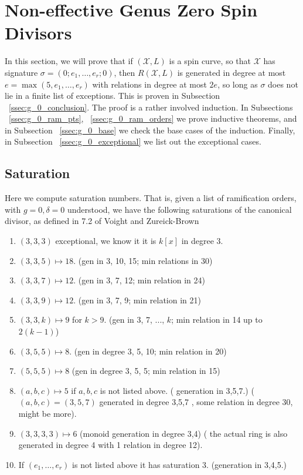 \documentclass{amsart}
\theoremstyle{plain}
\theoremstyle{definition}
\theoremstyle{remark}
\numberwithin{equation}{section}
\newcommand\ssec{\subsection}
\newcommand \sx{\mathscr X}
\newcommand \halfcan{L}
\begin{document}
\section{Non-effective Genus Zero Spin Divisors}
\label{sec:g_0_non_effective}

In this section, we will prove that if $(\sx,\halfcan)$ is a spin
curve, so that $\sx$ has signature $\sigma = (0; e_1, \ldots, e_r;0)
$, then $R(\sx,\halfcan)$ is generated in degree at most $e =
\max(5, e_1, \ldots, e_r)$ with relations in degree at most $2e$, so
long as $\sigma$ does not lie in a finite list of exceptions. This
is proven in Subsection ~\ref{ssec:g_0_conclusion}. The proof is a
rather involved induction. In Subsections ~\ref{ssec:g_0_ram_pts},
~\ref{ssec:g_0_ram_orders} we prove inductive theorems, and in
Subsection ~\ref{ssec:g_0_base} we check the base cases of the
induction. Finally, in Subsection ~\ref{ssec:g_0_exceptional} we
list out the exceptional cases.


\ssec{Saturation}
\label{ssec:g_0_saturation}

Here we compute saturation numbers. That is, given a list of
ramification orders, with $g = 0,\delta = 0$ understood, we have
the following saturations of the canonical divisor, as defined in
7.2 of Voight and Zureick-Brown \cite{vzb:stacky}
\begin{enumerate}
	\item $(3,3,3)$ exceptional, we know it it is $k[x]$ in degree 3.
	\item $(3,3,5) \mapsto 18.$ (gen in 3, 10, 15; min relations in 30)
	\item $(3,3,7) \mapsto 12.$ (gen in 3, 7, 12; min relation in 24) 
	\item $(3,3,9) \mapsto 12.$ (gen in 3, 7, 9; min relation in 21)
	\item $(3,3,k) \mapsto 9$ for $k > 9$. (gen in 3, 7, ..., $k$; 
min relation in 14 up to $2(k-1)$)
	\item $(3,5,5) \mapsto 8.$ (gen in degree 3, 5, 10; min relation 
in 20)
	\item $(5,5,5)\mapsto 8$ (gen in degree 3, 5, 5; min relation in 
15)
	\item $(a,b,c)\mapsto 5$ if $a,b,c$ is not listed above. (
generation in 3,5,7.) ($(a,b,c) = (3,5,7)$ generated in degree 3,5,7
, some relation in degree 30, might be more).
	\item $(3,3,3,3) \mapsto 6$ (monoid generation in degree 3,4) (
the actual ring is also generated in degree 4 with 1 relation in 
degree 12).
	\item If $(e_1,\ldots, e_r)$ is not listed above it has 
saturation $3$. (generation in 3,4,5.)
\end{enumerate}
\end{document}
